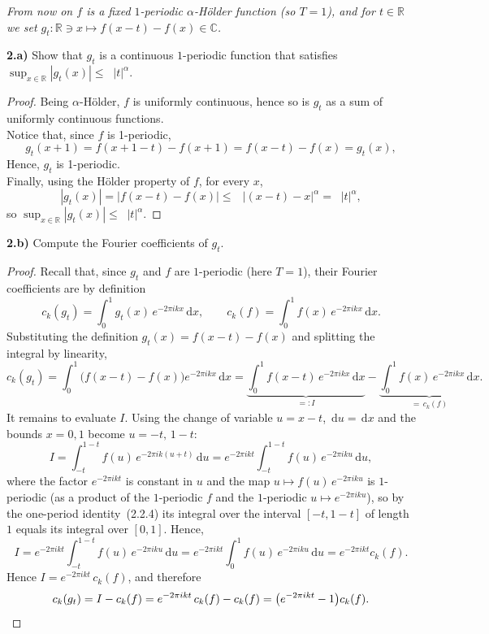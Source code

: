 \documentclass[11pt]{article}
\newcommand{\R}{\mathbb{R}}
\newcommand{\C}{\mathbb{C}}
\newcommand{\dd}{\,\mathrm{d}}
\newcommand{\abs}[1]{\left\lvert #1 \right\rvert}
\DeclareMathOperator{\Hf}{H_f}
\newcommand{\ck}[1]{c_{#1}}
\begin{document}
\medskip
\noindent\emph{From now on $f$ is a fixed $1$-periodic $\alpha$-H\"older function (so $T=1$), and for
$t\in\R$ we set $g_t:\R\ni x\mapsto f(x-t)-f(x)\in\C$.}

\bigskip
\noindent\textbf{2.a)} Show that $g_t$ is a continuous $1$-periodic function that satisfies
$\displaystyle\sup_{x\in\R}\abs{g_t(x)}\le \Hf\abs t^{\alpha}$.

\begin{proof}
Being $\alpha$-H\"older, $f$ is uniformly continuous, hence so is $g_t$ as a sum of uniformly continuous functions.
\\ Notice that, since $f$ is 1-periodic,
\[
g_t(x+1)=f(x+1-t)-f(x+1)=f(x-t)-f(x)=g_t(x),
\]
Hence, $g_t$ is 1-periodic.
\\Finally, using the H\"older property of $f$, for every $x$,
\[
\abs{g_t(x)}=\abs{f(x-t)-f(x)}\le \Hf\,\abs{(x-t)-x}^{\alpha}=\Hf\abs t^{\alpha},
\]
so $\displaystyle\sup_{x\in\R}\abs{g_t(x)}\le \Hf\abs t^{\alpha}$.
\end{proof}

\bigskip
\noindent\textbf{2.b)} Compute the Fourier coefficients of $g_t$.

\begin{proof}
Recall that, since $g_t$ and $f$ are $1$-periodic (here $T=1$), their Fourier coefficients are by
definition
\[
\ck{k}(g_t)=\int_0^1 g_t(x)\,e^{-2\pi i k x}\dd x,
\qquad
\ck{k}(f)=\int_0^1 f(x)\,e^{-2\pi i k x}\dd x .
\]
Substituting the definition $g_t(x)=f(x-t)-f(x)$ and splitting the integral by linearity,
\[
\ck{k}(g_t)
=\int_0^1\bigl(f(x-t)-f(x)\bigr)e^{-2\pi i k x}\dd x
=\underbrace{\int_0^1 f(x-t)\,e^{-2\pi i k x}\dd x}_{=:I}
-\underbrace{\int_0^1 f(x)\,e^{-2\pi i k x}\dd x}_{=\,\ck{k}(f)} .
\]
It remains to evaluate $I$. Using the change of variable $u=x-t$,  $\dd u=\dd x$ and the bounds $x=0,1$ become
$u=-t,\,1-t$:
\[
I=\int_{-t}^{1-t} f(u)\,e^{-2\pi i k(u+t)}\dd u
=e^{-2\pi i k t}\int_{-t}^{1-t} f(u)\,e^{-2\pi i k u}\dd u ,
\]
where the factor $e^{-2\pi i k t}$ is constant in $u$ and the map
$u\mapsto f(u)\,e^{-2\pi i k u}$ is $1$-periodic (as a product of the $1$-periodic $f$ and the
$1$-periodic $u\mapsto e^{-2\pi i k u}$), so by the one-period identity~(2.2.4) its integral over the
interval $[-t,1-t]$ of length $1$ equals its integral over $[0,1]$. Hence,
\[
I = e^{-2\pi i k t}\int_{-t}^{1-t} f(u)\,e^{-2\pi i k u}\dd u=e^{-2\pi i k t} \int_{0}^{1} f(u)\,e^{-2\pi i k u}\dd u= e^{-2\pi i k t} \ck{k}(f).
\]
Hence $I=e^{-2\pi i k t}\,\ck{k}(f)$, and therefore
\[
\ck{k}(g_t)=I-\ck{k}(f)=e^{-2\pi i k t}\,\ck{k}(f)-\ck{k}(f)=\bigl(e^{-2\pi i k t}-1\bigr)\ck{k}(f). \qedhere
\]
\end{proof}
\end{document}
